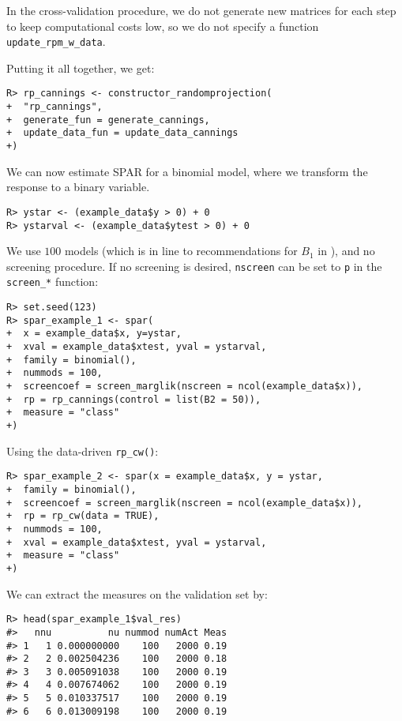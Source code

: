 \documentclass[
  article]{jss}
\begin{document}
In the cross-validation procedure, we do not generate new matrices for
each step to keep computational costs low, so we do not specify a
function \texttt{update\_rpm\_w\_data}.

Putting it all together, we get:

\begin{verbatim}
R> rp_cannings <- constructor_randomprojection(
+  "rp_cannings",
+  generate_fun = generate_cannings,
+  update_data_fun = update_data_cannings
+)
\end{verbatim}

We can now estimate SPAR for a binomial model, where we transform the
response to a binary variable.

\begin{verbatim}
R> ystar <- (example_data$y > 0) + 0
R> ystarval <- (example_data$ytest > 0) + 0
\end{verbatim}

We use \(100\) models (which is in line to recommendations for \(B_1\)
in \citet{cannings2017random}), and no screening procedure. If no
screening is desired, \texttt{nscreen} can be set to \texttt{p} in the
\texttt{screen\_*} function:

\begin{verbatim}
R> set.seed(123)   
R> spar_example_1 <- spar(
+  x = example_data$x, y=ystar,
+  xval = example_data$xtest, yval = ystarval,
+  family = binomial(),
+  nummods = 100, 
+  screencoef = screen_marglik(nscreen = ncol(example_data$x)),
+  rp = rp_cannings(control = list(B2 = 50)),
+  measure = "class"
+)
\end{verbatim}

Using the data-driven \texttt{rp\_cw()}:

\begin{verbatim}
R> spar_example_2 <- spar(x = example_data$x, y = ystar,
+  family = binomial(),
+  screencoef = screen_marglik(nscreen = ncol(example_data$x)),
+  rp = rp_cw(data = TRUE),
+  nummods = 100, 
+  xval = example_data$xtest, yval = ystarval,
+  measure = "class"
+)
\end{verbatim}

We can extract the measures on the validation set by:

\begin{verbatim}
R> head(spar_example_1$val_res)
#>   nnu          nu nummod numAct Meas
#> 1   1 0.000000000    100   2000 0.19
#> 2   2 0.002504236    100   2000 0.18
#> 3   3 0.005091038    100   2000 0.19
#> 4   4 0.007674062    100   2000 0.19
#> 5   5 0.010337517    100   2000 0.19
#> 6   6 0.013009198    100   2000 0.19
\end{verbatim}
\end{document}
